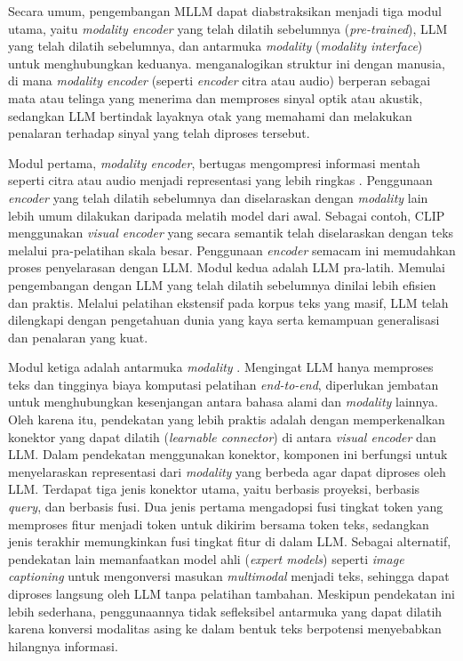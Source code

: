 Secara umum, pengembangan MLLM dapat diabstraksikan menjadi tiga modul utama, yaitu \textit{modality encoder} yang telah dilatih sebelumnya (\textit{pre-trained}), LLM yang telah dilatih sebelumnya, dan antarmuka \textit{modality} (\textit{modality interface}) untuk menghubungkan keduanya. \textcite{yinSurveyMultimodalLarge2024} menganalogikan struktur ini dengan manusia, di mana \textit{modality encoder} (seperti \textit{encoder} citra atau audio) berperan sebagai mata atau telinga yang menerima dan memproses sinyal optik atau akustik, sedangkan LLM bertindak layaknya otak yang memahami dan melakukan penalaran terhadap sinyal yang telah diproses tersebut.

Modul pertama, \textit{modality encoder}, bertugas mengompresi informasi mentah seperti citra atau audio menjadi representasi yang lebih ringkas \parencite{yinSurveyMultimodalLarge2024}. Penggunaan \textit{encoder} yang telah dilatih sebelumnya dan diselaraskan dengan \textit{modality} lain lebih umum dilakukan daripada melatih model dari awal. Sebagai contoh, CLIP \parencite{radfordLearningTransferableVisual2021} menggunakan \textit{visual encoder} yang secara semantik telah diselaraskan dengan teks melalui pra-pelatihan skala besar. Penggunaan \textit{encoder} semacam ini memudahkan proses penyelarasan dengan LLM. Modul kedua adalah LLM pra-latih. Memulai pengembangan dengan LLM yang telah dilatih sebelumnya dinilai lebih efisien dan praktis. Melalui pelatihan ekstensif pada korpus teks yang masif, LLM telah dilengkapi dengan pengetahuan dunia yang kaya serta kemampuan generalisasi dan penalaran yang kuat.

Modul ketiga adalah antarmuka \textit{modality} \parencite{yinSurveyMultimodalLarge2024}. Mengingat LLM hanya memproses teks dan tingginya biaya komputasi pelatihan \textit{end-to-end}, diperlukan jembatan untuk menghubungkan kesenjangan antara bahasa alami dan \textit{modality} lainnya. Oleh karena itu, pendekatan yang lebih praktis adalah dengan memperkenalkan konektor yang dapat dilatih (\textit{learnable connector}) di antara \textit{visual encoder} dan LLM. Dalam pendekatan menggunakan konektor, komponen ini berfungsi untuk menyelaraskan representasi dari \textit{modality} yang berbeda agar dapat diproses oleh LLM. Terdapat tiga jenis konektor utama, yaitu berbasis proyeksi, berbasis \textit{query}, dan berbasis fusi. Dua jenis pertama mengadopsi fusi tingkat token yang memproses fitur menjadi token untuk dikirim bersama token teks, sedangkan jenis terakhir memungkinkan fusi tingkat fitur di dalam LLM. Sebagai alternatif, pendekatan lain memanfaatkan model ahli (\textit{expert models}) seperti \textit{image captioning} untuk mengonversi masukan \textit{multimodal} menjadi teks, sehingga dapat diproses langsung oleh LLM tanpa pelatihan tambahan. Meskipun pendekatan ini lebih sederhana, penggunaannya tidak sefleksibel antarmuka yang dapat dilatih karena konversi modalitas asing ke dalam bentuk teks berpotensi menyebabkan hilangnya informasi.

